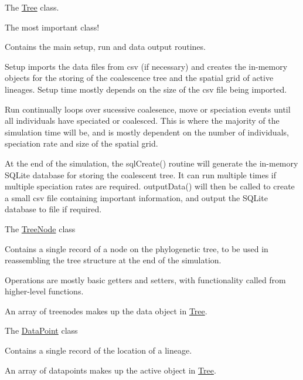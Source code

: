 \begin{DoxyItemize}
\item The {\ttfamily \hyperlink{class_tree}{Tree}} class.
\begin{DoxyItemize}
\item The most important class!
\item Contains the main setup, run and data output routines.
\item Setup imports the data files from csv (if necessary) and creates the in-\/memory objects for the storing of the coalescence tree and the spatial grid of active lineages. Setup time mostly depends on the size of the csv file being imported.
\item Run continually loops over sucessive coalesence, move or speciation events until all individuals have speciated or coalesced. This is where the majority of the simulation time will be, and is mostly dependent on the number of individuals, speciation rate and size of the spatial grid.
\item At the end of the simulation, the sql\+Create() routine will generate the in-\/memory S\+Q\+Lite database for storing the coalescent tree. It can run multiple times if multiple speciation rates are required. output\+Data() will then be called to create a small csv file containing important information, and output the S\+Q\+Lite database to file if required.
\end{DoxyItemize}
\item The {\ttfamily \hyperlink{class_tree_node}{Tree\+Node}} class
\begin{DoxyItemize}
\item Contains a single record of a node on the phylogenetic tree, to be used in reassembling the tree structure at the end of the simulation.
\item Operations are mostly basic getters and setters, with functionality called from higher-\/level functions.
\item An array of treenodes makes up the {\ttfamily data} object in {\ttfamily \hyperlink{class_tree}{Tree}}.
\end{DoxyItemize}
\item The {\ttfamily \hyperlink{class_data_point}{Data\+Point}} class
\begin{DoxyItemize}
\item Contains a single record of the location of a lineage.
\item An array of datapoints makes up the {\ttfamily active} object in {\ttfamily \hyperlink{class_tree}{Tree}}.

\end{DoxyItemize}
\end{DoxyItemize}
